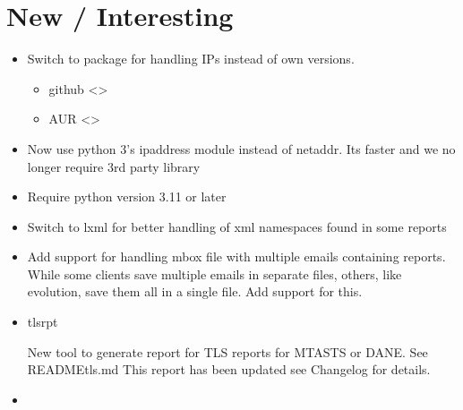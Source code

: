 \documentclass[letterpaper,10pt,english]{sphinxmanual}
\begin{document}
\section{New / Interesting}
\label{\detokenize{README:new-interesting}}
\sphinxAtStartPar
{}
\begin{itemize}
\item {} 
\sphinxAtStartPar
Switch to  package for handling IPs instead of own versions.
\begin{description}
\begin{itemize}
\item {} 
\sphinxAtStartPar
github \textless{}\textgreater{}

\item {} 
\sphinxAtStartPar
AUR \textless{}\textgreater{}

\end{itemize}

\end{description}

\item {} 
\sphinxAtStartPar
Now use python 3’s ipaddress module instead of netaddr.
Its faster and we no longer require 3rd party library

\item {} 
\sphinxAtStartPar
Require python version 3.11 or later

\item {} 
\sphinxAtStartPar
Switch to lxml for better handling of xml namespaces found in some reports

\item {} 
\sphinxAtStartPar
Add support for handling mbox file with multiple emails containing reports.
While some clients save multiple emails in separate  files, others, like
evolution, save them all in a single  file. Add support for this.

\item {} 
\sphinxAtStartPar
tls\sphinxhyphen{}rpt

\sphinxAtStartPar
New tool to generate report for TLS reports for MTA\sphinxhyphen{}STS or DANE. See README\sphinxhyphen{}tls.md
This report has been updated \sphinxhyphen{} see Changelog for details.

\item {} 
\sphinxAtStartPar
{}


\end{itemize}
\end{document}
